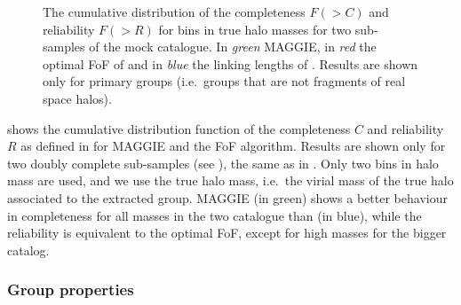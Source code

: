 \begin{figure}[t]
    \centering
    \begin{minipage}{0.49\linewidth}
    \end{minipage}
    \begin{minipage}{0.49\linewidth}
    \end{minipage}
    \caption{The cumulative distribution of the completeness $F(>C)$ and
        reliability $F(>R)$ for bins in true halo masses for two sub-samples of
        the mock catalogue. In \emph{green} MAGGIE, in \emph{red} the optimal
        FoF of \citet{Robotham+11} and in \emph{blue} the linking lengths of
    \citet{Berlind+06}. Results are shown only for primary groups (i.e.\
groups that are not fragments of real space halos).\label{fig:comp_rel}}
\end{figure}

 shows the cumulative distribution function of the
completeness $C$ and reliability $R$ as defined in
 for MAGGIE and the FoF algorithm.
Results are shown only for two doubly
complete sub-samples (see ), the same as in
\bartrefchapter{friends_of_friends_algorithm}. Only two bins in halo mass are
used, and we use the true halo mass, i.e.\ the virial mass of the true halo
associated to the extracted group. MAGGIE (in green) shows a better behaviour
in completeness for all masses in the two catalogue than \citet{Robotham+11}
(in blue), while the reliability is equivalent
to the optimal FoF, except for high masses for the bigger catalog.

\subsubsection{Group properties}

